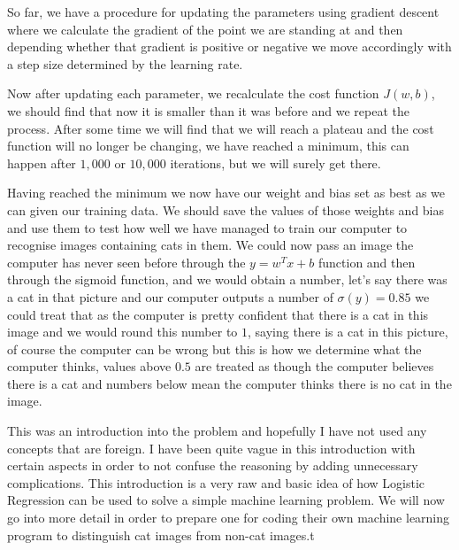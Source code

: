 So far, we have a procedure for updating the parameters
using gradient descent where we calculate the gradient of
the point we are standing at and then depending whether that
gradient is positive or negative we move accordingly with a
step size determined by the learning rate.

Now after updating each parameter, we recalculate the cost
function $J(w,b)$, we should find that now it is smaller
than it was before and we repeat the process. After some
time we will find that we will reach a plateau and the cost
function will no longer be changing, we have reached a
minimum, this can happen after $1,000$ or $10,000$
iterations, but we will surely get there.

Having reached the minimum we now have our weight and bias
set as best as we can given our training data. We should
save the values of those weights and bias and use them to
test how well we have managed to train our computer to
recognise images containing cats in them. We could now pass
an image the computer has never seen before through the $y =
w^T x + b$ function and then through the sigmoid function,
and we would obtain a number, let's say there was a cat in
that picture and our computer outputs a number of $\sigma(y)
= 0.85$ we could treat that as the computer is pretty
confident that there is a cat in this image and we would
round this number to $1$, saying there is a cat in this
picture, of course the computer can be wrong but this is how
we determine what the computer thinks, values above $0.5$
are treated as though the computer believes there is a cat
and numbers below mean the computer thinks there is no cat
in the image.

This was an introduction into the problem and hopefully I
have not used any concepts that are foreign. I have been
quite vague in this introduction with certain aspects in
order to not confuse the reasoning by adding unnecessary
complications. This introduction is a very raw and basic
idea of how Logistic Regression can be used to solve a
simple machine learning problem. We will now go into more
detail in order to prepare one for coding their own machine
learning program to distinguish cat images from non-cat
images.t
